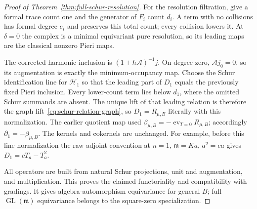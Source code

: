 \begin{proof}[Proof of Theorem~\ref{thm:full-schur-resolution}]
For the resolution filtration, give a formal trace count one and
the generator of $F_i$ count $d_i$. A term with no collisions has
formal degree $e_i$ and preserves this total count; every collision
lowers it. At $\delta=0$ the complex is a minimal equivariant pure
resolution, so its leading maps are the classical nonzero Pieri maps.

The corrected harmonic inclusion is $(1+h\mathcal A)^{-1}j$.
On degree zero, $\mathcal A j_0=0$, so its augmentation is exactly
the minimum-occupancy map. Choose the Schur identification line
for $\mathcal H_1$ so that the leading part of $D_1$ equals the
previously fixed Pieri inclusion. Every lower-count term lies below
$d_1$, where the omitted Schur summands are absent. The unique lift
of that leading relation is therefore the graph lift~\eqref{eq:schur-relation-graph}, so
$D_1=R_{\mu,B}$ literally with this normalization. The earlier
quotient map used $\beta_{\mu,B}=-\operatorname{ev}_{T=0}R_{\mu,B}$;
accordingly $\partial_1=-\beta_{\mu,B}$. The kernels and cokernels
are unchanged. For example, before this line normalization the raw
adjoint convention at $n=1$, $\mathfrak m=K a$, $a^2=ca$ gives
$D_1=cT_a-T_a^2$.

All operators are built from natural Schur projections, unit and
augmentation, and multiplication. This proves the claimed functoriality
and compatibility with gradings. It gives algebra-automorphism
equivariance for general $B$; full $\operatorname{GL}(\mathfrak m)$
equivariance belongs to the square-zero specialization.
\end{proof}

